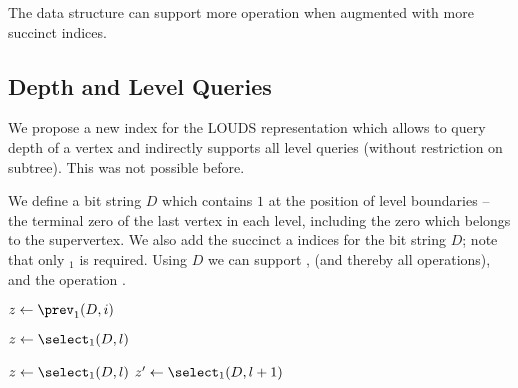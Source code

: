 \begin{algorithmic}
	\State {}
\EndFunction
\end{algorithmic}

\begin{algorithmic}
 
	\State {}
\EndFunction
\end{algorithmic}

\bigbreak

The data structure can support more operation when augmented with more succinct indices.

\subsection{Depth and Level Queries}

We propose a new index for the LOUDS representation which allows to query depth of a vertex and indirectly supports all level queries (without restriction on subtree).
This was not possible before.

We define a bit string $D$ which contains $1$ at the position of level boundaries -- the terminal zero of the last vertex in each level, including the zero which belongs to the supervertex.
We also add the succinct \rank{} a \select{} indices for the bit string $D$; note that only \select$_1$ is required.
Using $D$ we can support \levelRank{}, \levelSelect{} (and thereby all \levelAny{} operations), and the operation \dep{}.

\begin{algorithmic}
	\State $z \gets \prev_1(D, i)$ 
	\State {}
\EndFunction
\end{algorithmic}

\begin{algorithmic}
	\State $z \gets \select_1(D, l)$ 
	\State {}
\EndFunction
\end{algorithmic}

\begin{algorithmic}
	\State $z \gets \select_1(D, l)$ 
	\State $z' \gets \select_1(D, l + 1)$ 
	\State {}
\EndFunction
\end{algorithmic}

